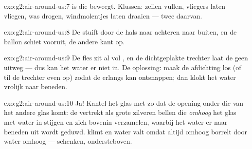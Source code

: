 \begin{solution}{exo:g2:air-around-us:7}
 is  die beweegt. Klussen: zeilen vullen, vliegers laten
vliegen, was drogen, windmolentjes laten draaien --- twee daarvan.
\end{solution}

\begin{solution}{exo:g2:air-around-us:8}
De  stuift door de hals naar achteren naar buiten, en de ballon
schiet vooruit, de andere kant op.
\end{solution}

\begin{solution}{exo:g2:air-around-us:9}
De fles zit al vol , en de dichtgeplakte trechter laat de
 geen uitweg --- dus kan het water er niet in. De oplossing: maak
de afdichting los (of til de trechter even op) zodat de 
erlangs kan ontsnappen; dan klokt het water vrolijk naar beneden.
\end{solution}

\begin{solution}{exo:g2:air-around-us:10}
Ja! Kantel het glas met  zo dat de opening onder die van het
andere glas komt: de  vertrekt als grote zilveren bellen die
\emph{omhoog} het glas met water in stijgen en zich bovenin
verzamelen, waarbij het water er naar beneden uit wordt geduwd.
 klimt en water valt omdat  altijd omhoog
borrelt door water omhoog --- schenken, ondersteboven.
\end{solution}
